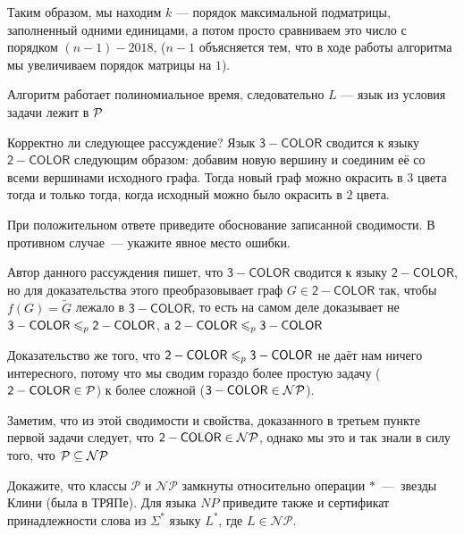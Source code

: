 \documentclass[a4paper,12pt]{article}
\begin{document}
\begin{solution}
\begin{enumerate}
		Таким образом, мы находим $k$ --- порядок максимальной подматрицы, заполненный одними единицами, а потом просто сравниваем это число с порядком $(n-1) - 2018$, ($n-1$ объясняется тем, что в ходе работы алгоритма мы увеличиваем порядок матрицы на $1$).
		
		Алгоритм работает полиномиальное время, следовательно $L$ --- язык из условия задачи лежит в $\P$
		
	\end{enumerate}
	
\end{solution}

\begin{tasknum}{3}
	Корректно ли следующее  рассуждение? Язык $\mathsf{3-COLOR}$ сводится к языку $\mathsf{2-COLOR}$ следующим образом: добавим новую вершину и соединим её со всеми вершинами исходного графа. Тогда новый граф можно окрасить в $3$ цвета тогда и только тогда, когда исходный можно было окрасить в $2$ цвета.
	
	При положительном ответе приведите обоснование записанной сводимости. В противном случае~--- укажите явное место ошибки.
\end{tasknum}

\begin{solution}
	
	Автор данного рассуждения пишет, что $\mathsf{3-COLOR}$ сводится к языку $\mathsf{2-COLOR}$, но для доказательства этого преобразовывает граф $G \in \mathsf{2-COLOR}$ так, чтобы $f(G) = \tilde{G}$ лежало в $\mathsf{3-COLOR}$, то есть на самом деле доказывает не $\mathsf{3-COLOR} \polysv \mathsf{2-COLOR}$, а $\mathsf{2-COLOR} \polysv \mathsf{3-COLOR}$
	
	Доказательство же того, что $\mathsf{2-COLOR} \polysv \mathsf{3-COLOR}$ не даёт нам ничего интересного, потому что мы сводим гораздо более простую задачу ($\mathsf{2-COLOR} \in \P$) к более сложной ($\mathsf{3-COLOR} \in \NP$).
	
	Заметим, что из этой сводимости и свойства, доказанного в третьем пункте первой задачи следует, что $\mathsf{2-COLOR} \in \NP$, однако мы это и так знали в силу того, что $\P \subseteq \NP$
	
\end{solution}

\begin{tasknum}{4}
	Докажите, что классы $\mathcal{P}$ и $\mathcal{NP}$ замкнуты относительно операции $*$~---~звезды Клини (была в ТРЯПе). Для языка $NP$ приведите также и сертификат принадлежности слова из $\Sigma^*$ языку $L^*$, где $L\in\mathcal{NP}$. 
\end{tasknum}
\end{document}
